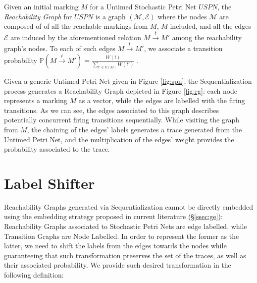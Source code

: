 \begin{definition}
	Given an initial marking $M$ for a Untimed Stochastic Petri Net $USPN$,  the \textit{Reachability Graph} for $USPN$ is a graph $(\mathcal{M},\mathcal{E})$ where the nodes  $\mathcal{M}$ are composed of of all the reachable markings from $M$, $M$ included, and all the edges $\mathcal{E}$ are induced by the aforementioned relation $M\overset{t}{\to}M'$ among the reachability graph's nodes. To each of such edges $M\overset{t}{\to}M'$, we associate a transition probability $\mathbb{P}\left(M\overset{t}{\to}M'\right)=\frac{W(t)}{\sum_{t'\in E(M)}W(t')}$ \cite{spdwe}. 
\end{definition}

\begin{example}
Given a generic Untimed Petri Net given in Figure \ref{fig:spn}, the Sequentialization process generates a Reachability Graph depicted in Figure \ref{fig:rg}: each node represents a marking $M$ as a vector, while the edges are labelled with the firing transitions. As we can see, the edges associated to this graph describes potentially concurrent firing transitions sequentially. While visiting the graph from $M$, the chaining of the edges' labels generates a trace generated from the Untimed Petri Net, and the multiplication of the edges' weight provides the probability associated to the trace.
\end{example}



\section{Label Shifter}\label{sec:LSift}
Reachability Graphs generated via Sequentialization cannot be directly embedded using the embedding strategy proposed in current literature (\S\ref{ssec:ge}):  Reachability Graphs associated to Stochastic Petri Nets are edge labelled, while Transition Graphs are Node Labelled. In order to represent the former as the latter, we need to shift the labels from the edges towards the nodes  while guaranteeing that such transformation preserves the set of the traces, as well as their associated probability. We provide such desired transformation in the following definition:

